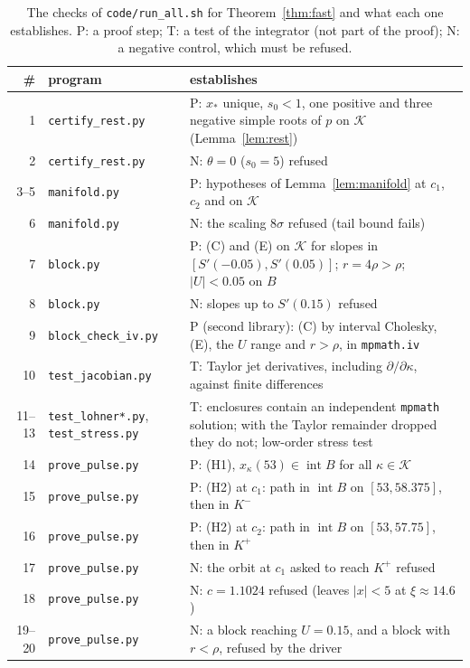 \documentclass[11pt]{article}
\theoremstyle{definition}
\newcommand{\Kset}{\mathcal{K}}
\newcommand{\xs}{x_*}
\begin{document}
\begin{table}[t]
\centering\footnotesize
\caption{The checks of \texttt{code/run\_all.sh} for Theorem~\ref{thm:fast} and what each one establishes. P: a proof step; T: a test of the integrator (not part of the proof); N: a negative control, which must be refused.}\label{tab:checks}
\begin{tabular}{rlp{}}
\toprule
\# & program & establishes \\
\midrule
1 & \texttt{certify\_rest.py} & P: $\xs$ unique, $s_0 < 1$, one positive and three negative simple roots of $p$ on $\Kset$ (Lemma~\ref{lem:rest}) \\
2 & \texttt{certify\_rest.py} & N: $\theta = 0$ ($s_0 = 5$) refused \\
3--5 & \texttt{manifold.py} & P: hypotheses of Lemma~\ref{lem:manifold} at $c_1$, $c_2$ and on $\Kset$ \\
6 & \texttt{manifold.py} & N: the scaling $8\sigma$ refused (tail bound fails) \\
7 & \texttt{block.py} & P: (C) and (E) on $\Kset$ for slopes in $[S'(-0.05), S'(0.05)]$; $r = 4\rho > \rho$; $|U| < 0.05$ on $B$ \\
8 & \texttt{block.py} & N: slopes up to $S'(0.15)$ refused \\
9 & \texttt{block\_check\_iv.py} & P (second library): (C) by interval Cholesky, (E), the $U$ range and $r > \rho$, in \texttt{mpmath.iv} \\
10 & \texttt{test\_jacobian.py} & T: Taylor jet derivatives, including $\partial/\partial\kappa$, against finite differences \\
11--13 & \texttt{test\_lohner*.py}, \texttt{test\_stress.py} & T: enclosures contain an independent \texttt{mpmath} solution; with the Taylor remainder dropped they do not; low-order stress test \\
14 & \texttt{prove\_pulse.py} & P: (H1), $x_\kappa(53) \in \operatorname{int} B$ for all $\kappa \in \Kset$ \\
15 & \texttt{prove\_pulse.py} & P: (H2) at $c_1$: path in $\operatorname{int} B$ on $[53, 58.375]$, then in $K^-$ \\
16 & \texttt{prove\_pulse.py} & P: (H2) at $c_2$: path in $\operatorname{int} B$ on $[53, 57.75]$, then in $K^+$ \\
17 & \texttt{prove\_pulse.py} & N: the orbit at $c_1$ asked to reach $K^+$ refused \\
18 & \texttt{prove\_pulse.py} & N: $c = 1.1024$ refused (leaves $|x| < 5$ at $\xi \approx 14.6$) \\
19--20 & \texttt{prove\_pulse.py} & N: a block reaching $U = 0.15$, and a block with $r < \rho$, refused by the driver \\
\bottomrule
\end{tabular}
\end{table}
\end{document}
